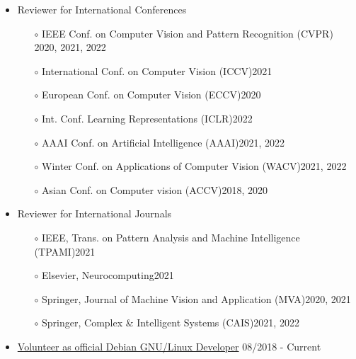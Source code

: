 \documentclass[10pt,margin,line,pifont,palatino,courier]{res}
\begin{document}
\begin{resume}
\begin{itemize}[leftmargin=*]
\item Reviewer for International Conferences
	\begin{itemize}[noitemsep, leftmargin=*]
		\item[$\circ$] IEEE Conf. on Computer Vision and Pattern Recognition (CVPR) \hfill 2020, 2021, 2022
		\item[$\circ$] International Conf. on Computer Vision (ICCV)\hfill 2021
		\item[$\circ$] European Conf. on Computer Vision (ECCV)\hfill 2020
		\item[$\circ$] Int. Conf. Learning Representations (ICLR)\hfill 2022
		\item[$\circ$] AAAI Conf. on Artificial Intelligence (AAAI)\hfill 2021, 2022
		\item[$\circ$] Winter Conf. on Applications of Computer Vision (WACV)\hfill 2021, 2022
		\item[$\circ$] Asian Conf. on Computer vision (ACCV)\hfill 2018, 2020
	\end{itemize}
\item Reviewer for International Journals
	\begin{itemize}[noitemsep, leftmargin=*]
		\item[$\circ$] IEEE, Trans. on Pattern Analysis and Machine Intelligence (TPAMI)\hfill 2021
		\item[$\circ$] Elsevier, Neurocomputing\hfill 2021
		\item[$\circ$] Springer, Journal of Machine Vision and Application (MVA)\hfill 2020, 2021
		\item[$\circ$] Springer, Complex \& Intelligent Systems (CAIS)\hfill 2021, 2022
	\end{itemize}
\item \href{https://nm.debian.org/person/lumin/}{Volunteer as official Debian GNU/Linux Developer}
	\hfill 08/2018 - Current\\
\end{itemize}

%
%
%


\end{resume}
\end{document}
